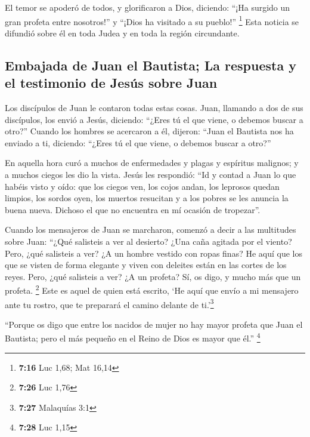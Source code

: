 \begin{paracol}{2}
 El temor se apoderó de todos, y glorificaron a Dios,
diciendo: ``¡Ha surgido un gran profeta entre nosotros!'' y ``¡Dios ha
visitado a su pueblo!'' \footnote{\textbf{7:16} Luc 1,68; Mat 16,14}
 Esta noticia se difundió sobre él en toda Judea y en
toda la región circundante.

\hypertarget{embajada-de-juan-el-bautista-la-respuesta-y-el-testimonio-de-jesuxfas-sobre-juan}{%
\subsection{Embajada de Juan el Bautista; La respuesta y el testimonio
de Jesús sobre
Juan}\label{embajada-de-juan-el-bautista-la-respuesta-y-el-testimonio-de-jesuxfas-sobre-juan}}

 Los discípulos de Juan le contaron todas estas cosas.
 Juan, llamando a dos de sus discípulos, los envió a
Jesús, diciendo: ``¿Eres tú el que viene, o debemos buscar a otro?''
 Cuando los hombres se acercaron a él, dijeron: ``Juan el
Bautista nos ha enviado a ti, diciendo: ``¿Eres tú el que viene, o
debemos buscar a otro?''

 En aquella hora curó a muchos de enfermedades y plagas y
espíritus malignos; y a muchos ciegos les dio la vista. 
Jesús les respondió: ``Id y contad a Juan lo que habéis visto y oído:
que los ciegos ven, los cojos andan, los leprosos quedan limpios, los
sordos oyen, los muertos resucitan y a los pobres se les anuncia la
buena nueva.  Dichoso el que no encuentra en mí ocasión
de tropezar''.

 Cuando los mensajeros de Juan se marcharon, comenzó a
decir a las multitudes sobre Juan: ``¿Qué salisteis a ver al desierto?
¿Una caña agitada por el viento?  Pero, ¿qué salisteis a
ver? ¿A un hombre vestido con ropas finas? He aquí que los que se visten
de forma elegante y viven con deleites están en las cortes de los reyes.
 Pero, ¿qué salisteis a ver? ¿A un profeta? Sí, os digo,
y mucho más que un profeta. \footnote{\textbf{7:26} Luc 1,76}
 Este es aquel de quien está escrito, `He aquí que envío
a mi mensajero ante tu rostro, que te preparará el camino delante de
ti.'\footnote{\textbf{7:27} Malaquías 3:1}

 ``Porque os digo que entre los nacidos de mujer no hay
mayor profeta que Juan el Bautista; pero el más pequeño en el Reino de
Dios es mayor que él.'' \footnote{\textbf{7:28} Luc 1,15}


\end{paracol}
